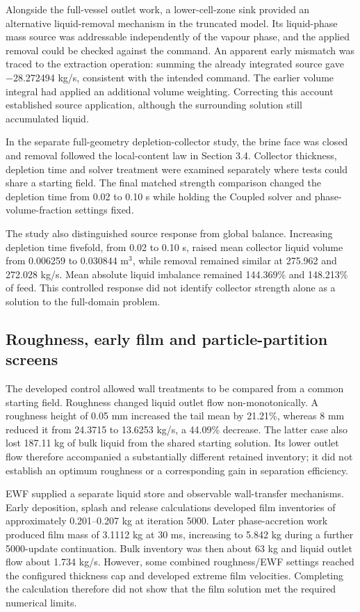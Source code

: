 Alongside the full-vessel outlet work, a lower-cell-zone sink provided an alternative liquid-removal mechanism in the truncated model. Its liquid-phase mass source was addressable independently of the vapour phase, and the applied removal could be checked against the command. An apparent early mismatch was traced to the extraction operation: summing the already integrated source gave −28.272494 kg/s, consistent with the intended command. The earlier volume integral had applied an additional volume weighting. Correcting this account established source application, although the surrounding solution still accumulated liquid.

In the separate full-geometry depletion-collector study, the brine face was closed and removal followed the local-content law in Section 3.4. Collector thickness, depletion time and solver treatment were examined separately where tests could share a starting field. The final matched strength comparison changed the depletion time from 0.02 to 0.10 s while holding the Coupled solver and phase-volume-fraction settings fixed.

The study also distinguished source response from global balance. Increasing depletion time fivefold, from 0.02 to 0.10 s, raised mean collector liquid volume from 0.006259 to 0.030844 m\(^3\), while removal remained similar at 275.962 and 272.028 kg/s. Mean absolute liquid imbalance remained 144.369\% and 148.213\% of feed. This controlled response did not identify collector strength alone as a solution to the full-domain problem.

\subsection{Roughness, early film and particle-partition screens}

The developed control allowed wall treatments to be compared from a common starting field. Roughness changed liquid outlet flow non-monotonically. A roughness height of 0.05 mm increased the tail mean by 21.21\%, whereas 8 mm reduced it from 24.3715 to 13.6253 kg/s, a 44.09\% decrease. The latter case also lost 187.11 kg of bulk liquid from the shared starting solution. Its lower outlet flow therefore accompanied a substantially different retained inventory; it did not establish an optimum roughness or a corresponding gain in separation efficiency.

EWF supplied a separate liquid store and observable wall-transfer mechanisms. Early deposition, splash and release calculations developed film inventories of approximately 0.201--0.207 kg at iteration 5000. Later phase-accretion work produced film mass of 3.1112 kg at 30 ms, increasing to 5.842 kg during a further 5000-update continuation. Bulk inventory was then about 63 kg and liquid outlet flow about 1.734 kg/s. However, some combined roughness/EWF settings reached the configured thickness cap and developed extreme film velocities. Completing the calculation therefore did not show that the film solution met the required numerical limits.


